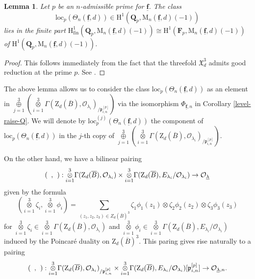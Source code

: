 \documentclass[10pt]{amsart}
\numberwithin{equation}{section}
\theoremstyle{plain}
\newtheorem{lemma}[theorem]{Lemma}
\numberwithin{equation}{section}
\theoremstyle{definition}
\theoremstyle{remark}
\def\loc{\mathrm{loc}}
\def\interX{\mathfrak{X}}
\def\undlamb{\underline{\lambda}}
\def\triplef{\underline{\mathbf{f}}}
\def\threetensor{\overset{3}{\underset{i=1}\otimes}}
\def\threesum{\overset{3}{\underset{j=1}\oplus} }
\def\calO{\mathcal{O}}
\def\frakp{\mathfrak{p}}
\def\FF{\mathbf{F}}
\def\QQ{\mathbf{Q}}
\def\rmH{\mathrm{H}}
\def\rmM{\mathrm{M}}
\def\rmZ{\mathrm{Z}}
\begin{document}
\begin{lemma}
Let $p$ be an $n$-admissible prime for $\triplef$. The class 
\begin{equation*}
\loc_{p}(\Theta_{n}(\triplef, d))\in \rmH^{1}(\QQ_{p}, \rmM_{n}(\triplef, d)(-1)) 
\end{equation*}
lies in the finite part $\rmH^{1}_{\mathrm{fin}}(\QQ_{p}, \rmM_{n}(\triplef, d)(-1))\cong \rmH^{1}(\FF_{p}, \rmM_{n}(\triplef, d)(-1))$ of  $\rmH^{1}(\QQ_{p}, \rmM_{n}(\triplef, d)(-1))$. 
\end{lemma}
\begin{proof}
This follows immediately from the fact that the threefold $\interX^{3}_{d}$ admits good reduction at the prime $p$. See \cite[Lemma 3.4]{Liu-HZ}. 
\end{proof}
The above lemma allows us to consider the class $\loc_{p}(\Theta_{n}(\triplef, d))$ as an element in $\threesum(\threetensor\Gamma(\rmZ_{d}(\overline{B}), \calO_{\lambda_{i}})_{/\frakp^{[p]}_{i,n}})$
via the isomorphism $\Phi_{\triplef, n}$ in Corollary \ref{level-raise-Q}. We will denote by 
$\loc^{(j)}_{p}(\Theta_{n}(\triplef, d))$
the component of $\loc_{p}(\Theta_{n}(\triplef, d))$ in the $j$-th copy of $\threesum(\threetensor\Gamma(\rmZ_{d}(\overline{B}), \calO_{\lambda_{i}})_{/\frakp^{[p]}_{i, n}})$. 

On the other hand, we have a bilinear pairing 
\begin{equation*}
(\hphantom{a}, \hphantom{b}): \threetensor\Gamma(\rmZ_{d}(\overline{B}), \calO_{\lambda_{i}})\times  \threetensor\Gamma(\rmZ_{d}(\overline{B}), E_{\lambda_{i}}/\calO_{\lambda_{i}})\rightarrow \calO_{\undlamb}
\end{equation*}
given by the formula
\begin{equation*}
(\threetensor\zeta_{i}, \threetensor\phi_{i})=\sum_{(z_{1}, z_{2}, z_{3})\in Z_{d}(\overline{B})^{3}}\zeta_{1}\phi_{1}(z_{1})\otimes\zeta_{2}\phi_{2}(z_{2})\otimes\zeta_{3}\phi_{3}(z_{3})
\end{equation*}
for $\threetensor\zeta_{i}\in  \threetensor\Gamma(\rmZ_{d}(\overline{B}), \calO_{\lambda_{i}})$ and $\threetensor\phi_{i}\in \threetensor\Gamma(\rmZ_{d}(\overline{B}), E_{\lambda_{i}}/\calO_{\lambda_{i}})$ induced by the Poincar\'e duality on $\rmZ_{d}(\overline{B})^{3}$. This paring gives rise naturally to a pairing 
\begin{equation*}
 (\hphantom{a}, \hphantom{b}): \threetensor\Gamma(\rmZ_{d}(\overline{B}), \calO_{\lambda_{i}})_{/\frakp^{[p]}_{i, n}}\times\threetensor\Gamma(\rmZ_{d}(\overline{B}), E_{\lambda_{i}}/\calO_{\lambda_{i}})[\frakp^{[p]}_{i, n}]\rightarrow \calO_{\undlamb, n}.
\end{equation*}
\end{document}
